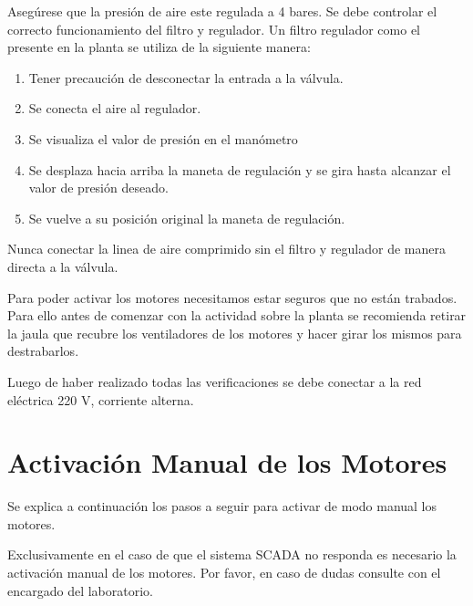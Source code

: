 \begin{tcolorbox}[title=Presión de aire]
  Asegúrese que la presión de aire este regulada a 4 bares. Se debe controlar 
  el correcto funcionamiento del filtro y regulador. 
 \tcblower
  Un filtro regulador como el presente en la planta se utiliza de la siguiente 
  manera: 
 \begin{enumerate}
    \item Tener precaución de desconectar la entrada a la válvula. 
    \item Se conecta el aire al regulador. 
    \item Se visualiza el valor de presión en el manómetro
    \item Se desplaza hacia arriba la maneta de regulación y se gira hasta 
      alcanzar el valor de presión deseado.
    \item Se vuelve a su posición original la maneta de regulación.
 \end{enumerate}
\end {tcolorbox}

\begin{lattention}
Nunca conectar la linea de aire comprimido sin el filtro y  
regulador de manera directa a la válvula.
\end{lattention}


\begin{tcolorbox}[title=Motores]
Para poder activar los motores necesitamos estar seguros que no están trabados.
 Para ello antes de comenzar con la actividad sobre la planta se recomienda 
retirar la jaula que recubre los ventiladores de los motores y hacer girar los 
mismos para destrabarlos.
\end {tcolorbox}


\begin{lattention}
Luego de haber realizado todas las verificaciones se debe conectar a la red 
eléctrica 220 V, corriente alterna.
\end{lattention}


 
 \section{Activación Manual de los Motores}
  Se explica a continuación los pasos a seguir para activar de modo manual los 
motores.
 \begin{lattention}
 Exclusivamente en el caso de que el sistema SCADA no responda 
 es necesario la activación manual de los motores.
 Por favor, en caso de dudas consulte con el encargado del laboratorio.
\end{lattention}

